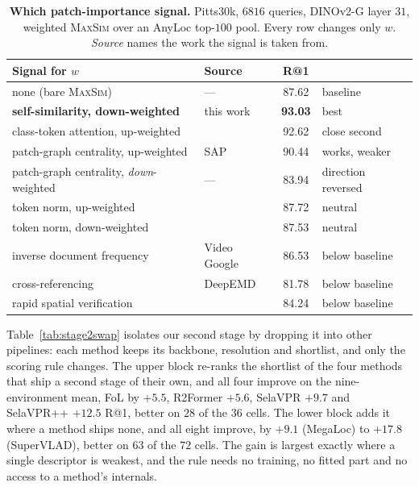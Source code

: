 \begin{table}[t]
\caption{\textbf{Which patch-importance signal.} Pitts30k, $6816$ queries, DINOv2-G layer $31$, weighted \textsc{MaxSim} over an AnyLoc top-$100$ pool. Every row changes only $w$. \emph{Source} names the work the signal is taken from.}
\label{tab:w-signal}
\centering
{\footnotesize
\begin{tabular}{ll c l}
\toprule
Signal for $w$   &   Source   &  R@1 &   \\
\midrule
none (bare \textsc{MaxSim})   &   ---   &  87.62 &   baseline \\
\midrule
\textbf{self-similarity, down-weighted}   &   this work   &  \textbf{93.03} &   best \\
class-token attention, up-weighted    &    \citep{effovpr}    &  92.62 &    close second \\
patch-graph centrality, up-weighted    &    SAP    &  90.44 &    works, weaker \\
\midrule
patch-graph centrality, \emph{down}-weighted   &   ---   &  83.94 &   direction reversed \\
token norm, up-weighted    &    \citep{registers}    &  87.72 &    neutral \\
token norm, down-weighted    &    \citep{registers}    &  87.53 &    neutral \\
inverse document frequency    &    Video Google    &  86.53 &    below baseline \\
cross-referencing    &    DeepEMD    &  81.78 &    below baseline \\
rapid spatial verification    &    \citep{patchnetvlad}    &  84.24 &    below baseline \\
\bottomrule
\end{tabular}%
}\end{table}

Table~\ref{tab:stage2swap} isolates our second stage by dropping it into other pipelines: each method keeps its backbone, resolution and shortlist, and only the scoring rule changes. The upper block re-ranks the shortlist of the four methods that ship a second stage of their own, and all four improve on the nine-environment mean, FoL by $+5.5$, R2Former $+5.6$, SelaVPR $+9.7$ and SelaVPR++ $+12.5$ R@1, better on $28$ of the $36$ cells. The lower block adds it where a method ships none, and all eight improve, by $+9.1$ (MegaLoc) to $+17.8$ (SuperVLAD), better on $63$ of the $72$ cells. The gain is largest exactly where a single descriptor is weakest, and the rule needs no training, no fitted part and no access to a method's internals.

